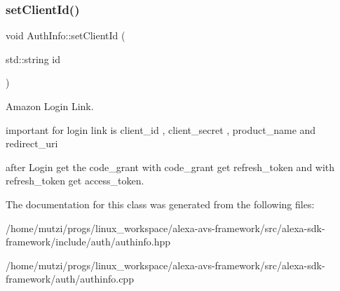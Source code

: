 \subsubsection{\texorpdfstring{set\+Client\+Id()}{setClientId()}}
{\footnotesize\ttfamily void Auth\+Info\+::set\+Client\+Id (\begin{DoxyParamCaption}\item[{std\+::string}]{id }\end{DoxyParamCaption})}



Amazon Login Link. 

important for login link is client\+\_\+id , client\+\_\+secret , product\+\_\+name and redirect\+\_\+uri

after Login get the code\+\_\+grant with code\+\_\+grant get refresh\+\_\+token and with refresh\+\_\+token get access\+\_\+token. 

The documentation for this class was generated from the following files\+:\begin{DoxyCompactItemize}
\item 
/home/mutzi/progs/linux\+\_\+workspace/alexa-\/avs-\/framework/src/alexa-\/sdk-\/framework/include/auth/authinfo.\+hpp\item 
/home/mutzi/progs/linux\+\_\+workspace/alexa-\/avs-\/framework/src/alexa-\/sdk-\/framework/auth/authinfo.\+cpp\end{DoxyCompactItemize}
